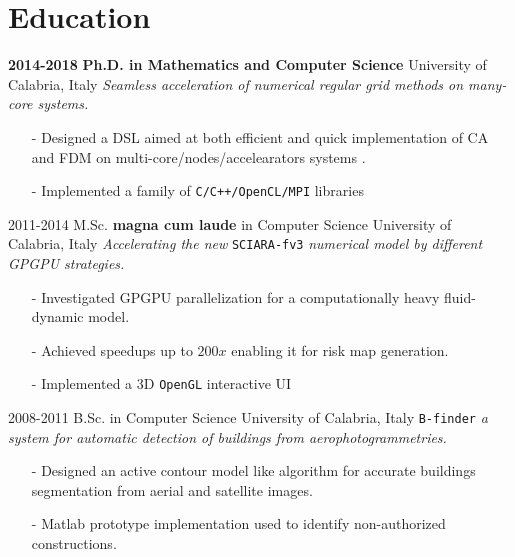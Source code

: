 \documentclass[]{twentysecondscv}
\begin{document}
\section{Education}

\begin{twenty}
	\fivetwentyitem
	{\textbf{\color{darkgray}2014-2018}}
	{\textbf{\color{darkgray}Ph.D. in Mathematics and Computer Science}}
	{University of Calabria, Italy}
	{\emph{Seamless acceleration of numerical regular grid methods on many-core systems.}\href{https://doi.org/10.1016/j.jocs.2018.09.012}{\faBook}}
	{
		\vspace{-15pt}
		\begin{itemize}[leftmargin=*]
			\footnotesize
			\item[-] Designed a DSL aimed at both efficient and quick implementation of CA and FDM on multi-core/nodes/accelearators systems .
			\item[-] Implemented a family of \texttt{C/C++/OpenCL/MPI} libraries \href{www.blablabla.it}{\faGithub} 
		\end{itemize} 
	}
	\fivetwentyitem
	{2011-2014}
	{M.Sc. \textbf{\color{darkgray}magna cum laude} in Computer Science}
	{University of Calabria, Italy}
	{\emph{Accelerating the new} \texttt{SCIARA-fv3} \emph{numerical model by different GPGPU strategies.} \href{https://dl.acm.org/citation.cfm?id=3059134}{\faBook}}
	{
		\vspace{-15pt}
		\begin{itemize}[leftmargin=*]
			\footnotesize
			\item[-] Investigated GPGPU parallelization for a computationally heavy fluid-dynamic model.
			\item[-] Achieved speedups up to $200x$ enabling it for risk map generation.
			\item[-] Implemented a 3D \texttt{OpenGL} interactive UI
		\end{itemize} 
	}
	\fivetwentyitem
	{2008-2011}
	{B.Sc. in Computer Science}
	{University of Calabria, Italy}
	{\texttt{B-finder}\emph{ a system for automatic detection of buildings from aerophotogrammetries.}}
	{
		\vspace{-15pt}
		\begin{itemize}[leftmargin=*]
			\footnotesize
			\item[-] Designed an active contour model like algorithm for accurate buildings segmentation from aerial and satellite images.
			\item[-] Matlab prototype implementation used to identify non-authorized constructions.
		\end{itemize} 
	}
\end{twenty}
\end{document}
